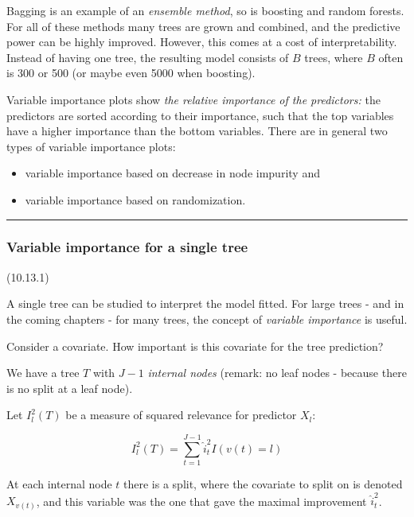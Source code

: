 \documentclass[
  letterpaper,
  DIV=11,
  numbers=noendperiod]{scrartcl}
\providecommand{\tightlist}{%
  \setlength{\itemsep}{0pt}\setlength{\parskip}{0pt}}\usepackage{longtable,booktabs,array}
\begin{document}
Bagging is an example of an \emph{ensemble method}, so is boosting and
random forests. For all of these methods many trees are grown and
combined, and the predictive power can be highly improved. However, this
comes at a cost of interpretability. Instead of having one tree, the
resulting model consists of \(B\) trees, where \(B\) often is 300 or 500
(or maybe even 5000 when boosting).

Variable importance plots show \emph{the relative importance of the
predictors:} the predictors are sorted according to their importance,
such that the top variables have a higher importance than the bottom
variables. There are in general two types of variable importance plots:

\begin{itemize}
\tightlist
\item
  variable importance based on decrease in node impurity and
\item
  variable importance based on randomization.
\end{itemize}

\begin{center}\rule{0.5\linewidth}{0.5pt}\end{center}

\hypertarget{variable-importance-for-a-single-tree}{%
\subsubsection{Variable importance for a single
tree}\label{variable-importance-for-a-single-tree}}

(10.13.1)

A single tree can be studied to interpret the model fitted. For large
trees - and in the coming chapters - for many trees, the concept of
\emph{variable importance} is useful.

Consider a covariate. How important is this covariate for the tree
prediction?

We have a tree \(T\) with \(J-1\) \emph{internal nodes} (remark: no leaf
nodes - because there is no split at a leaf node).

Let \(I_l^2(T)\) be a measure of squared relevance for predictor
\(X_l\):

\[ I_l^2(T)=\sum_{t=1}^{J-1} \hat{i}^2_t I(v(t)=l)\]

At each internal node \(t\) there is a split, where the covariate to
split on is denoted \(X_{v(t)}\), and this variable was the one that
gave the maximal improvement \(\hat{i}^2_t\).
\end{document}
